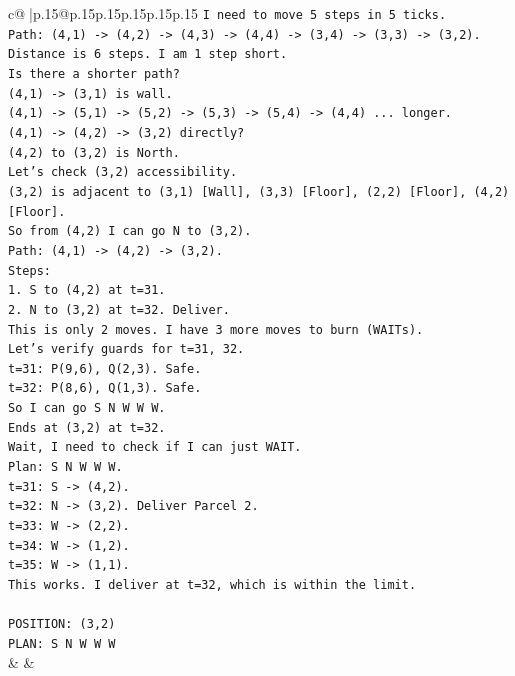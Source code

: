 \documentclass{article}
\begin{document}
{\begin{supertabular}{c@{$\;$}|p{.15\linewidth}@{}p{.15\linewidth}p{.15\linewidth}p{.15\linewidth}p{.15\linewidth}p{.15\linewidth}}
{{{\texttt{I need to move 5 steps in 5 ticks.} \\
\texttt{Path: (4,1) {-}> (4,2) {-}> (4,3) {-}> (4,4) {-}> (3,4) {-}> (3,3) {-}> (3,2).} \\
\texttt{Distance is 6 steps. I am 1 step short.} \\
\texttt{Is there a shorter path?} \\
\texttt{(4,1) {-}> (3,1) is wall.} \\
\texttt{(4,1) {-}> (5,1) {-}> (5,2) {-}> (5,3) {-}> (5,4) {-}> (4,4) ... longer.} \\
\texttt{(4,1) {-}> (4,2) {-}> (3,2) directly?} \\
\texttt{(4,2) to (3,2) is North.} \\
\texttt{Let's check (3,2) accessibility.} \\
\texttt{(3,2) is adjacent to (3,1) {[}Wall{]}, (3,3) {[}Floor{]}, (2,2) {[}Floor{]}, (4,2) {[}Floor{]}.} \\
\texttt{So from (4,2) I can go N to (3,2).} \\
\texttt{Path: (4,1) {-}> (4,2) {-}> (3,2).} \\
\texttt{Steps:} \\
\texttt{1. S to (4,2) at t=31.} \\
\texttt{2. N to (3,2) at t=32. Deliver.} \\
\texttt{This is only 2 moves. I have 3 more moves to burn (WAITs).} \\
\texttt{Let's verify guards for t=31, 32.} \\
\texttt{t=31: P(9,6), Q(2,3). Safe.} \\
\texttt{t=32: P(8,6), Q(1,3). Safe.} \\
\texttt{So I can go S N W W W.} \\
\texttt{Ends at (3,2) at t=32.} \\
\texttt{Wait, I need to check if I can just WAIT.} \\
\texttt{Plan: S N W W W.} \\
\texttt{t=31: S {-}> (4,2).} \\
\texttt{t=32: N {-}> (3,2). Deliver Parcel 2.} \\
\texttt{t=33: W {-}> (2,2).} \\
\texttt{t=34: W {-}> (1,2).} \\
\texttt{t=35: W {-}> (1,1).} \\
\texttt{This works. I deliver at t=32, which is within the limit.} \\
\\ 
\texttt{POSITION: (3,2)} \\
\texttt{PLAN: S N W W W} \\
            }
        }
    }
    & & \\ \\


\end{supertabular}}
\end{document}
